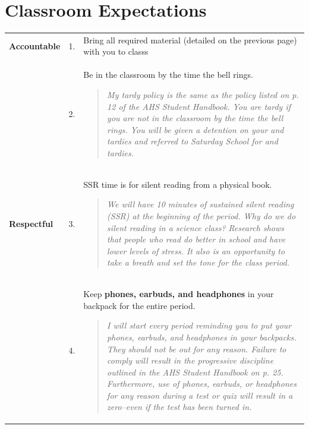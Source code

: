 \documentclass[10pt]{exam}
\newcommand{\mg}{\rowcolor{Goldenrod}}
\begin{document}
\section*{Classroom Expectations}

\begin{center}
  \begin{tabular}
    {
      p{2.2cm}
      p{0.28cm}
      p{12.7cm}
		}
		
    \hline
      \mg \bf Accountable 
      &  1. & 
			Bring all required material (detailed on the previous page) with 	you to classs
      \\
      \mg   
			&  2. & 
			Be in the classroom by the time the bell rings.
			  \vspace{-1em}
				\begin{quotation}
					\noindent\small
					\textit{My tardy policy is the same as the policy listed on p. 12  of the AHS Student Handbook.  You are tardy if you are not in the classroom by the time the bell rings.  You will be given a detention on your \nth{3} and \nth{4} tardies and referred to Saturday School for \nth{5} and \nth{6} tardies.}
				\end{quotation}
      \\
    \hline
    \bf Respectful
          &  3. &
					SSR time is for silent reading from a physical book.
						\vspace{-1em}
						\begin{quotation}
							\noindent\small
							\textit{We will have 10 minutes of sustained silent reading (SSR) at the beginning of the period.  Why do we do silent reading in a science class?  Research shows that people who read do better in school and have lower levels of stress.  It also is an opportunity to take a breath and set the tone for the class period.}
						\end{quotation}
          \\   
          &  4. & 
					Keep \textbf{phones, earbuds, and headphones} in your backpack for the entire period.  
						\vspace{-2em}
						\begin{quotation}
							\noindent\small
							\textit{I will start every period reminding you to put your phones, earbuds, and headphones in your backpacks. They should not be out for any reason.  Failure to comply will result in the progressive discipline outlined in the AHS Student Handbook on p. 25.  Furthermore, use of phones, earbuds, or headphones for any reason during a test or quiz will result in a zero--even if the test has been turned in.}
						\end{quotation}     
          \\  


\end{tabular}
\end{center}
\end{document}
